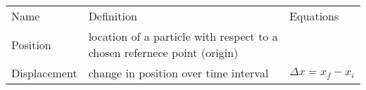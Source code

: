 \documentclass[12pt]{article}
\begin{document}
\begin{table}
	\begin{tabular}{lll}
		Name & Definition & Equations \\
		Position & location of a particle with respect to a chosen refernece point (origin) & \\
		Displacement & change in position over time interval & $ \Delta x=x_{f} - x_{i} $ \\
	\end{tabular}
\end{table}
\end{document}
